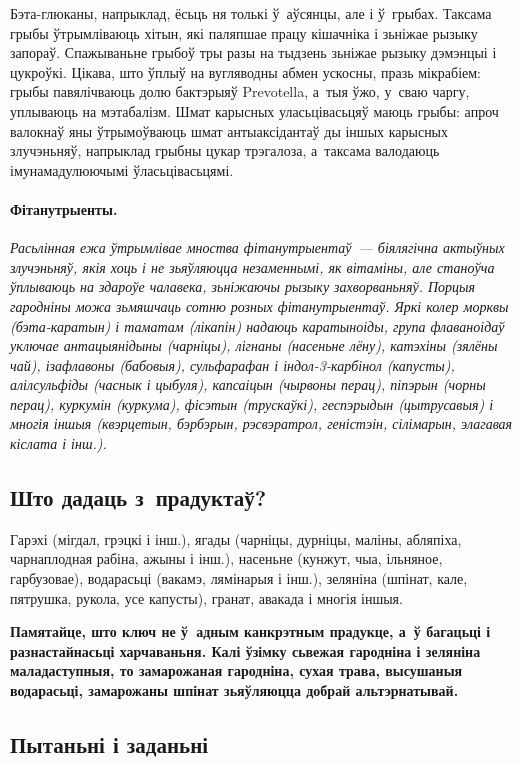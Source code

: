 Бэта-глюканы, напрыклад, ёсьць ня толькі ў~аўсянцы, але і ў~грыбах. Таксама грыбы ўтрымліваюць хітын, які паляпшае працу кішачніка і зьніжае рызыку запораў. Спажываньне грыбоў тры разы на тыдзень зьніжае рызыку дэмэнцыі і цукроўкі. Цікава, што ўплыў на вугляводны абмен ускосны, празь мікрабіем: грыбы павялічваюць долю бактэрыяў Prevotella, а~тыя ўжо, у~сваю чаргу, уплываюць на мэтабалізм. Шмат карысных уласьцівасьцяў маюць грыбы: апроч валокнаў яны ўтрымоўваюць шмат антыаксідантаў ды іншых карысных злучэньняў, напрыклад грыбны цукар трэгалоза, а~таксама валодаюць імунамадулюючымі ўласьцівасьцямі.

\paragraph{Фітанутрыенты.} \emph{Расьлінная ежа ўтрымлівае мноства фітанутрыентаў~--- біялягічна актыўных злучэньняў, якія хоць і не зьяўляюцца незаменнымі, як вітаміны, але станоўча ўплываюць на здароўе чалавека, зьніжаючы рызыку захворваньняў. Порцыя гародніны можа зьмяшчаць сотню розных фітанутрыентаў. Яркі колер морквы (бэта-каратын) і таматам (лікапін) надаюць каратыноіды, група флаваноідаў уключае антацыянідыны (чарніцы), лігнаны (насеньне лёну), катэхіны (зялёны чай), ізафлавоны (бабовыя), сульфарафан і індол-3-карбінол (капусты), алілсульфіды (часнык і цыбуля), капсаіцын (чырвоны перац), піпэрын (чорны перац), куркумін (куркума), фісэтын (трускаўкі), геспэрыдын (цытрусавыя) і многія іншыя (квэрцетын, бэрбэрын, рэсвэратрол, геністэін, сілімарын, элагавая кіслата і інш.).}

\subsection*{Што дадаць з~прадуктаў?} 
Гарэхі (мігдал, грэцкі і інш.), ягады (чарніцы, дурніцы, маліны, абляпіха, чарнаплодная рабіна, ажыны і інш.), насеньне (кунжут, чыа, ільняное, гарбузовае), водарасьці (вакамэ, лямінарыя і інш.), зеляніна (шпінат, кале, пятрушка, рукола, усе капусты), гранат, авакада і многія іншыя. 

\textbf{Памятайце, што ключ не ў~адным канкрэтным прадукце, а~ў багацьці і разнастайнасьці харчаваньня. Калі ўзімку сьвежая гародніна і зеляніна маладаступныя, то замарожаная гародніна, сухая трава, высушаныя водарасьці, замарожаны шпінат зьяўляюцца добрай альтэрнатывай.}

\subsection*{Пытаньні і заданьні}

